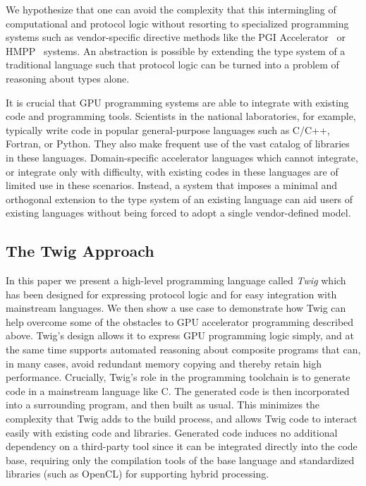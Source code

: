 We hypothesize that one can avoid the complexity that this
intermingling of computational and protocol logic without resorting to
specialized programming systems such as vendor-specific directive
methods like the PGI Accelerator~\cite{pgi-accelerate} or
HMPP~\cite{hmpp} systems. An abstraction is possible by extending the
type system of a traditional language such that protocol logic can be
turned into a problem of reasoning about types alone.


It is crucial that GPU programming systems are able to integrate with
existing code and programming tools. Scientists in the national
laboratories, for example, typically write code in popular
general-purpose languages such as C/C++, Fortran, or Python. They also
make frequent use of the vast catalog of libraries in these
languages. Domain-specific accelerator languages which cannot
integrate, or integrate only with difficulty, with existing codes in
these languages are of limited use in these scenarios. Instead, a
system that imposes a minimal and orthogonal extension to the type
system of an existing language can aid users of existing languages
without being forced to adopt a single vendor-defined model.

\subsection{The Twig Approach}

In this paper we present a high-level programming language called
\emph{Twig} which has been designed for expressing protocol logic and
for easy integration with mainstream languages. We then show a use
case to demonstrate how Twig can help overcome some of the obstacles
to GPU accelerator programming described above. Twig's design allows
it to express GPU programming logic simply, and at the same time
supports automated reasoning about composite programs that can, in
many cases, avoid redundant memory copying and thereby retain high
performance. Crucially, Twig's role in the programming toolchain is to
generate code in a mainstream language like C. The generated code is
then incorporated into a surrounding program, and then built as
usual. This minimizes the complexity that Twig adds to the build
process, and allows Twig code to interact easily with existing code
and libraries. Generated code induces no additional dependency on a
third-party tool since it can be integrated directly into the code
base, requiring only the compilation tools of the base language and
standardized libraries (such as OpenCL) for supporting hybrid
processing.

